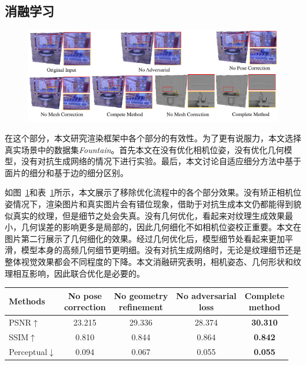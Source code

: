 \subsection{消融学习}
\begin{figure}[!t]
\centering
\includegraphics[width=1\linewidth]{pic/work2/compare4.pdf}

\label{fig:ex2_5}
\end{figure}





在这个部分，本文研究渲染框架中各个部分的有效性。为了更有说服力，本文选择真实场景中的数据集\emph{Fountain}。首先本文在没有优化相机位姿，没有优化几何模型，没有对抗生成网络的情况下进行实验。最后，本文讨论自适应细分方法中基于面片的细分和基于边的细分区别。\par
如图~\ref{fig:ex2_5}和表~\ref{tab:ablation}所示，本文展示了移除优化流程中的各个部分效果。没有矫正相机位姿情况下，渲染图片和真实图片会有错位现象，借助于对抗生成本文仍都能得到貌似真实的纹理，但是细节之处会失真。没有几何优化，看起来对纹理生成效果最小，几何误差的影响更多是局部的，因此几何细化不如相机位姿校正重要。本文在图片第二行展示了几何细化的效果。经过几何优化后，模型细节处看起来更加平滑，模型本身的高频几何细节更明细。没有对抗生成网络时，无论是纹理细节还是整体视觉效果都会不同程度的下降。本文消融研究表明，相机姿态、几何形状和纹理相互影响，因此联合优化是必要的。\par

\begin{table}[!h]
\renewcommand{\arraystretch}{1.3}
\label{tab:ablation}
	\centering
		\begin{tabular}{lcccc}
			\hline
			{Methods} & \tabincell{c}{No pose \\ correction} & \tabincell{c}{No geometry \\ refinement} & \tabincell{c}{No adversarial \\ loss} & \tabincell{c}{Complete \\ method} \\
			\hline
			PSNR$\uparrow$ & 23.215 & 29.336 & 28.374 & \textbf{30.310}\\
			SSIM$\uparrow$ & 0.810 & 0.844 & 0.864 & \textbf{0.842}\\
			Perceptual$\downarrow$ & 0.094 & 0.067 & 0.055 & \textbf{0.055}\\
			\hline
		\end{tabular}
\end{table}

